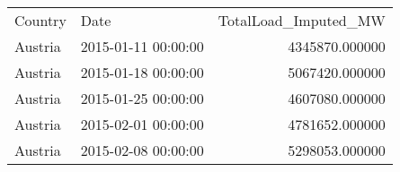 \begin{tabular}{llr}
Country & Date & TotalLoad_Imputed_MW \\
Austria & 2015-01-11 00:00:00 & 4345870.000000 \\
Austria & 2015-01-18 00:00:00 & 5067420.000000 \\
Austria & 2015-01-25 00:00:00 & 4607080.000000 \\
Austria & 2015-02-01 00:00:00 & 4781652.000000 \\
Austria & 2015-02-08 00:00:00 & 5298053.000000 \\
\end{tabular}
